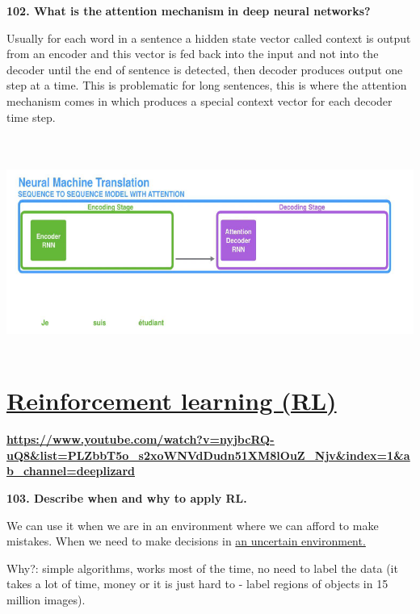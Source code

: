 \textbf{102. What is the} \textbf{attention mechanism} \textbf{in deep
neural networks?}

Usually for each word in a sentence a hidden state vector called context
is output from an encoder and this vector is fed back into the input and
not into the decoder until the end of sentence is detected, then decoder
produces output one step at a time. This is problematic for long
sentences, this is where the attention mechanism comes in which produces
a special context vector for each decoder time step.

\hypertarget{section}{%
\section{\texorpdfstring{\protect\includegraphics[width=6.05908in,height=2.45313in]{media/image18.png}}{}}\label{section}}

\hypertarget{reinforcement-learning-rl}{%
\section{\texorpdfstring{\underline{Reinforcement learning
(RL)}}{Reinforcement learning (RL)}}\label{reinforcement-learning-rl}}

\href{https://www.youtube.com/watch?v=nyjbcRQ-uQ8\&list=PLZbbT5o_s2xoWNVdDudn51XM8lOuZ_Njv\&index=1\&ab_channel=deeplizard}{\textbf{\underline{https://www.youtube.com/watch?v=nyjbcRQ-uQ8\&list=PLZbbT5o\_s2xoWNVdDudn51XM8lOuZ\_Njv\&index=1\&ab\_channel=deeplizard}}}

\textbf{103. Describe when and why to apply RL.}

We can use it when we are in an environment where we can afford to make
mistakes. When we need to make decisions in \underline{an uncertain
environment.}

Why?: simple algorithms, works most of the time, no need to label the
data (it takes a lot of time, money or it is just hard to - label
regions of objects in 15 million images).

